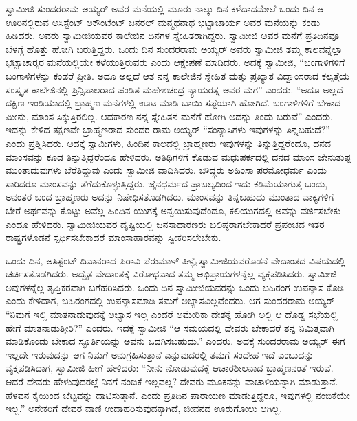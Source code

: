  ಸ್ವಾಮೀಜಿ ಸುಂದರರಾಮ ಅಯ್ಯರ್ ಅವರ ಮನೆಯಲ್ಲಿ ಮೂರು ನಾಲ್ಕು ದಿನ ಕಳೆದಾದಮೇಲೆ ಒಂದು ದಿನ ಆ ಊರಿನಲ್ಲಿರುವ ಅಸಿಸ್ಟೆಂಟ್ ಅಕೌಂಟೆಂಟ್ ಜನರಲ್ ಮನ್ಮಥನಾಥ ಭಟ್ಟಾಚಾರ್ಯ ಅವರ ಮನೆಯನ್ನು ಕಂಡು ಹಿಡಿದರು. ಅವರು ಸ್ವಾಮೀಜಿಯವರ ಕಾಲೇಜಿನ ದಿನಗಳ ಸ್ನೇಹಿತರಾಗಿದ್ದರು. ಸ್ವಾಮೀಜಿ ಅವರ ಮನೆಗೆ ಪ್ರತಿದಿನವೂ ಬೆಳಗ್ಗೆ ಹೊತ್ತು ಹೋಗಿ ಬರುತ್ತಿದ್ದರು. ಒಂದು ದಿನ ಸುಂದರರಾಮ ಅಯ್ಯರ್ ಅವರು ಸ್ವಾಮೀಜಿ ತಮ್ಮ ಕಾಲವನ್ನೆಲ್ಲಾ ಭಟ್ಟಾಚಾರ‍್ಯರ ಮನೆಯಲ್ಲಿಯೇ ಕಳೆಯುತ್ತಿರುವರು ಎಂದು ಆಕ್ಷೇಪಣೆ ಮಾಡಿದರು. ಅದಕ್ಕೆ ಸ್ವಾಮೀಜಿ, “ಬಂಗಾಳಿಗಳಿಗೆ ಬಂಗಾಳಿಗಳನ್ನು ಕಂಡರೆ ಪ್ರೀತಿ. ಅದೂ ಅಲ್ಲದೆ ಆತ ನನ್ನ ಕಾಲೇಜಿನ ಸ್ನೇಹಿತ ಮತ್ತು ಪ್ರಖ್ಯಾತ ವಿದ್ವಾಂಸರಾದ ಕಲ್ಕತ್ತೆಯ ಸಂಸ್ಕೃತ ಕಾಲೇಜಿನಲ್ಲಿ ಪ್ರಿನ್ಸಿಪಾಲರಾದ ಪಂಡಿತ ಮಹೇಶಚಂದ್ರ ನ್ಯಾಯರತ್ನ ಅವರ ಮಗ” ಎಂದರು. “ಅದೂ ಅಲ್ಲದೆ ದಕ್ಷಿಣ ಇಂಡಿಯಾದಲ್ಲಿ ಬ್ರಾಹ್ಮಣ ಮನೆಗಳಲ್ಲಿ ಊಟ ಮಾಡಿ ಬಾಯಿ ಸಪ್ಪೆಯಾಗಿ ಹೋಗಿದೆ. ಬಂಗಾಳಿಗಳಿಗೆ ಬೇಕಾದ ಮೀನು, ಮಾಂಸ ಸಿಕ್ಕುತ್ತಿರಲಿಲ್ಲ. ಆದಕಾರಣ ನನ್ನ ಸ್ನೇಹಿತನ ಮನೆಗೆ ಹೋಗಿ ಅದನ್ನು ತಿಂದು ಬರುವೆ” ಎಂದರು. ಇದನ್ನು ಕೇಳಿದ ತಕ್ಷಣವೇ ಬ್ರಾಹ್ಮಣರಾದ ಸುಂದರ ರಾಮ ಅಯ್ಯರ್ “ಸಂನ್ಯಾಸಿಗಳು ಇವುಗಳನ್ನು ತಿನ್ನಬಹುದೆ?” ಎಂದು ಪ್ರಶ್ನಿಸಿದರು. ಅದಕ್ಕೆ ಸ್ವಾಮಿಗಳು, ಹಿಂದಿನ ಕಾಲದಲ್ಲಿ ಬ್ರಾಹ್ಮಣರು ಇವುಗಳನ್ನು ತಿನ್ನುತ್ತಿದ್ದರೆಂದೂ, ದನದ ಮಾಂಸವನ್ನು ಕೂಡ ತಿನ್ನುತ್ತಿದ್ದರೆಂದೂ ಹೇಳಿದರು. ಅತಿಥಿಗಳಿಗೆ ಕೊಡುವ ಮಧುಪರ್ಕದಲ್ಲಿ ದನದ ಮಾಂಸ ಜೇನುತುಪ್ಪ ಮುಂತಾದುವುಗಳು ಬೆರೆತಿದ್ದುವು ಎಂದು ಸ್ವಾಮೀಜಿ ವಾದಿಸಿದರು. ಬೌದ್ಧರು ಅಹಿಂಸಾ ಪರಮೋಧರ್ಮ ಎಂದು ಸಾರಿದರೂ ಮಾಂಸವನ್ನು ತೆಗೆದುಕೊಳ್ಳುತ್ತಿದ್ದರು. ಜೈನಧರ್ಮದ ಪ್ರಾಬಲ್ಯದಿಂದ ಇದು ಕಡಿಮೆಯಾಗುತ್ತ ಬಂದು, ಅನಂತರ ಬಂದ ಬ್ರಾಹ್ಮಣರು ಅದನ್ನು ನಿಷೇಧಿಸತೊಡಗಿದರು. ಮಾಂಸವನ್ನು ತಿನ್ನಬಹುದು ಮುಂತಾದ ವಾಕ್ಯಗಳಿಗೆ ಬೇರೆ ಅರ್ಥವನ್ನು ಕೊಟ್ಟು ಅವೆಲ್ಲ ಹಿಂದಿನ ಯುಗಕ್ಕೆ ಅನ್ವಯಿಸುವುದೆಂದೂ, ಕಲಿಯುಗದಲ್ಲಿ ಅವನ್ನು ವರ್ಜಿಸಬೇಕು ಎಂದೂ ಹೇಳಿದರು. ಸ್ವಾಮೀಜಿಯವರ ದೃಷ್ಟಿಯಲ್ಲಿ ಜನಸಾಧಾರಣರು ಬಲಿಷ್ಠರಾಗಬೇಕಾದರೆ ಪ್ರಪಂಚದ ಇತರ ರಾಷ್ಟ್ರಗಳೊಡನೆ ಸ್ಪರ್ಧಿಸಬೇಕಾದರೆ ಮಾಂಸಾಹಾರವನ್ನು ಸ್ವೀಕರಿಸಲೇಬೇಕು. 

 ಒಂದು ದಿನ, ಅಸಿಸ್ಟೆಂಟ್ ದಿವಾನರಾದ ಪಿರಾವಿ ಪೆರುಮಾಳ್ ಪಿಳ್ಳೈ ಸ್ವಾಮೀಜಿಯವರೊಡನೆ ವೇದಾಂತದ ವಿಷಯದಲ್ಲಿ ಚರ್ಚಿಸತೊಡಗಿದರು. ಅದ್ವೈತ ವೇದಾಂತಕ್ಕೆ ವಿರೋಧವಾದ ತಮ್ಮ ಅಭಿಪ್ರಾಯಗಳನ್ನೆಲ್ಲ ವ್ಯಕ್ತಪಡಿಸಿದರು. ಸ್ವಾಮೀಜಿ ಅವುಗಳನ್ನೆಲ್ಲ ತೃಪ್ತಿಕರವಾಗಿ ಬಗೆಹರಿಸಿದರು. ಒಂದು ದಿನ ಸ್ವಾಮೀಜಿಯವರನ್ನು ಒಂದು ಬಹಿರಂಗ ಉಪನ್ಯಾಸ ಕೊಡಿ ಎಂದು ಕೇಳಿದಾಗ, ಬಹಿರಂಗದಲ್ಲಿ ಉಪನ್ಯಾಸಮಾಡಿ ತಮಗೆ ಅಭ್ಯಾಸವಿಲ್ಲವೆಂದರು. ಆಗ ಸುಂದರರಾಮ ಅಯ್ಯರ್ “ನಿಮಗೆ ಇಲ್ಲಿ ಮಾತನಾಡುವುದಕ್ಕೆ ಅಭ್ಯಾಸ ಇಲ್ಲ ಎಂದರೆ ಅಮೇರಿಕಾ ದೇಶಕ್ಕೆ ಹೋಗಿ ಅಲ್ಲಿ ಆ ದೊಡ್ಡ ಸಭೆಯಲ್ಲಿ ಹೇಗೆ ಮಾತನಾಡುತ್ತೀರಿ?” ಎಂದರು. ಇದಕ್ಕೆ ಸ್ವಾಮೀಜಿ “ಆ ಸಮಯದಲ್ಲಿ ದೇವರು ಬೇಕಾದರೆ ತನ್ನ ನಿಮಿತ್ತವಾಗಿ ಮಾಡಿಕೊಂಡು ಬೇಕಾದ ಸ್ಫೂರ್ತಿಯನ್ನು ಅವನು ಒದಗಿಸಬಹುದು.” ಎಂದರು. ಅದಕ್ಕೆ ಸುಂದರರಾಮ ಅಯ್ಯರ್ ಈಗ ಇಲ್ಲದೇ ಇರುವುದನ್ನು ಆಗ ನಿಮಗೆ ಅನುಗ್ರಹಿಸುತ್ತಾನೆ ಎನ್ನುವುದರಲ್ಲಿ ತಮಗೆ ಸಂದೇಹ ಇದೆ ಎಂಬುದನ್ನು ವ್ಯಕ್ತಪಡಿಸಿದಾಗ, ಸ್ವಾಮೀಜಿ ಹೀಗೆ ಹೇಳಿದರು: “ನೀನು ನೋಡುವುದಕ್ಕೆ ಆಚಾರಶೀಲನಾದ ಬ್ರಾಹ್ಮಣನಂತೆ ಇರುವೆ. ಆದರೆ ದೇವರು ಹೇಳುವುದರಲ್ಲೆ ನಿನಗೆ ನಂಬಿಕೆ ಇಲ್ಲವಲ್ಲ? ದೇವರು ಮೂಕನನ್ನು ವಾಚಾಳಿಯನ್ನಾಗಿ ಮಾಡುತ್ತಾನೆ. ಹೆಳವನ ಕೈಯಿಂದ ಬೆಟ್ಟವನ್ನು ದಾಟಿಸುತ್ತಾನೆ. ಎಂದು ಪ್ರತಿದಿನ ಪಾರಾಯಣ ಮಾಡುತ್ತಿದ್ದರೂ, ಇವುಗಳಲ್ಲಿ ನಂಬಿಕೆಯೇ ಇಲ್ಲ.” ಅನೇಕರಿಗೆ ದೇವರ ವಾಣಿ ಉದಾಹರಿಸುವುದಕ್ಕಾಗಿದೆ, ಜೀವನದ ಊರುಗೋಲು ಆಗಿಲ್ಲ. 

